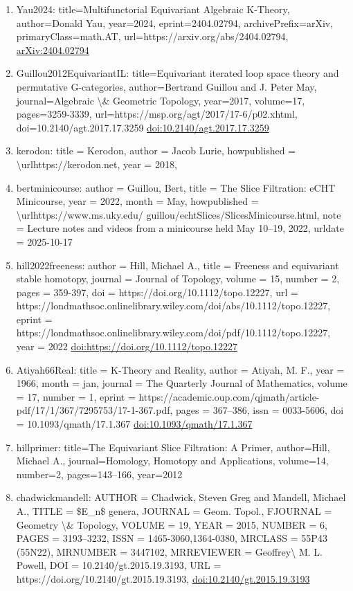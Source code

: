 \documentclass[11pt]{article}
\begin{document}
\begin{enumerate}[leftmargin=*]
  \item Yau2024: title=Multifunctorial Equivariant Algebraic K-Theory, author=Donald Yau, year=2024, eprint=2404.02794, archivePrefix=arXiv, primaryClass=math.AT, url=https://arxiv.org/abs/2404.02794, \href{https://arxiv.org/abs/2404.02794}{arXiv:2404.02794}
  \item Guillou2012EquivariantIL: title=Equivariant iterated loop space theory and permutative G-categories, author=Bertrand Guillou and J. Peter May, journal=Algebraic \textbackslash{}\& Geometric Topology, year=2017, volume=17, pages=3259-3339, url=https://msp.org/agt/2017/17-6/p02.xhtml, doi=10.2140/agt.2017.17.3259 \href{https://doi.org/10.2140/agt.2017.17.3259}{doi:10.2140/agt.2017.17.3259}
  \item kerodon: title = Kerodon, author = Jacob Lurie, howpublished = \textbackslash{}urlhttps://kerodon.net, year = 2018,
  \item bertminicourse: author = Guillou, Bert, title = The Slice Filtration: eCHT Minicourse, year = 2022, month = May, howpublished = \textbackslash{}urlhttps://www.ms.uky.edu/ guillou/echtSlices/SlicesMinicourse.html, note = Lecture notes and videos from a minicourse held May 10--19, 2022, urldate = 2025-10-17
  \item hill2022freeness: author = Hill, Michael A., title = Freeness and equivariant stable homotopy, journal = Journal of Topology, volume = 15, number = 2, pages = 359-397, doi = https://doi.org/10.1112/topo.12227, url = https://londmathsoc.onlinelibrary.wiley.com/doi/abs/10.1112/topo.12227, eprint = https://londmathsoc.onlinelibrary.wiley.com/doi/pdf/10.1112/topo.12227, year = 2022 \href{https://doi.org/https://doi.org/10.1112/topo.12227}{doi:https://doi.org/10.1112/topo.12227}
  \item Atiyah66Real: title = K-Theory and Reality, author = Atiyah, M. F., year = 1966, month = jan, journal = The Quarterly Journal of Mathematics, volume = 17, number = 1, eprint = https://academic.oup.com/qjmath/article-pdf/17/1/367/7295753/17-1-367.pdf, pages = 367--386, issn = 0033-5606, doi = 10.1093/qmath/17.1.367 \href{https://doi.org/10.1093/qmath/17.1.367}{doi:10.1093/qmath/17.1.367}
  \item hillprimer: title=The Equivariant Slice Filtration: A Primer, author=Hill, Michael A., journal=Homology, Homotopy and Applications, volume=14, number=2, pages=143--166, year=2012
  \item chadwickmandell: AUTHOR = Chadwick, Steven Greg and Mandell, Michael A., TITLE = \$E\_n\$ genera, JOURNAL = Geom. Topol., FJOURNAL = Geometry \textbackslash{}\& Topology, VOLUME = 19, YEAR = 2015, NUMBER = 6, PAGES = 3193--3232, ISSN = 1465-3060,1364-0380, MRCLASS = 55P43 (55N22), MRNUMBER = 3447102, MRREVIEWER = Geoffrey\textbackslash{} M. L. Powell, DOI = 10.2140/gt.2015.19.3193, URL = https://doi.org/10.2140/gt.2015.19.3193, \href{https://doi.org/10.2140/gt.2015.19.3193}{doi:10.2140/gt.2015.19.3193}

\end{enumerate}
\end{document}
